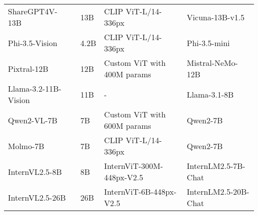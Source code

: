 \begin{table*}[ht!]
\begin{center}
{\begin{tabular}{l|lll}
ShareGPT4V-13B~\cite{sharegpt4v}            & 13B                     &  CLIP ViT-L/14-336px           &    Vicuna-13B-v1.5                           \\ 
Phi-3.5-Vision~\cite{phi}           & 4.2B                    & CLIP ViT-L/14-336px                   & Phi-3.5-mini                \\ 
Pixtral-12B~\cite{pixtral}              & 12B                     &  Custom ViT with 400M params           & Mistral-NeMo-12B                 \\ 
Llama-3.2-11B-Vision~\cite{llama3.2}      & 11B                     &   -                               &     Llama-3.1-8B                        \\ 
Qwen2-VL-7B~\cite{qwen2-vl}              & 7B                      &    Custom ViT with 600M params          &  Qwen2-7B                    \\ 
Molmo-7B~\cite{molmo}                  & 7B                      & CLIP ViT-L/14-336px               & Qwen2-7B                   \\ 
InternVL2.5-8B~\cite{internVL2.5}            & 8B                      & InternViT-300M-448px-V2.5        & InternLM2.5-7B-Chat        \\ 
InternVL2.5-26B~\cite{internVL2.5}           & 26B                     & InternViT-6B-448px-V2.5          & InternLM2.5-20B-Chat       \\ \bottomrule
\end{tabular}%
}
\label{model_card}
\end{center}
\end{table*}

\begin{table*}[ht!]
\caption{Model cards of safeguard models used in our human evaluation experiments.}
\begin{center}
\vskip 0.15in
\centering
{}
\label{guardmodel_cards}
\end{center}
\end{table*}


